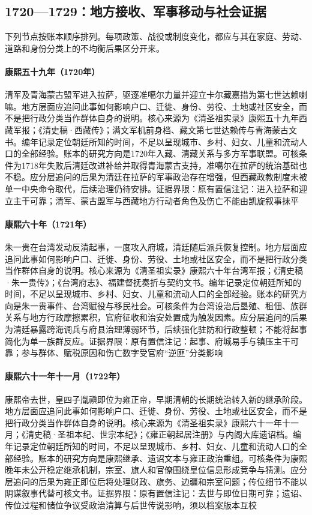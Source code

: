 \subsection{1720—1729：地方接收、军事移动与社会证据}
下列节点按账本顺序排列。每项政策、战役或制度变化，都应与其在家庭、劳动、道路和身份分类上的不均衡后果区分开来。
\hypertarget{social:EQ-1720-LHASA-RESTORATION}{}\paragraph{康熙五十九年（1720年）}清军及青海蒙古盟军进入拉萨，驱逐准噶尔力量并迎立卡尔藏嘉措为第七世达赖喇嘛。地方层面应追问此事如何影响户口、迁徙、身份、劳役、土地或社区安全，而不是把行政分类当作群体自身的说明。核心来源为《清圣祖实录》康熙五十九年西藏军报；《清史稿·西藏传》；满文军机前身档、藏文第七世达赖传与青海蒙古文书。编年记录定位朝廷所知的时间，不足以呈现城市、乡村、妇女、儿童和流动人口的全部经验。账本的研究方向是1720年入藏、清藏关系与多方军事联盟。可核条件为1718年失败后清廷改进补给并取得青海蒙古支持，准噶尔在拉萨的统治基础也不稳。应分层追问的后果为清廷在拉萨的军事政治存在增强，但西藏政教制度未被单一中央命令取代，后续治理仍待安排。证据界限：原有置信注记：进入拉萨和迎立主干可靠；清军、蒙古盟军与西藏地方行动者角色及伤亡不能由凯旋叙事抹平
\hypertarget{social:EQ-1721-ZHU-YIGUI}{}\paragraph{康熙六十年（1721年）}朱一贵在台湾发动反清起事，一度攻入府城，清廷随后派兵恢复控制。地方层面应追问此事如何影响户口、迁徙、身份、劳役、土地或社区安全，而不是把行政分类当作群体自身的说明。核心来源为《清圣祖实录》康熙六十年台湾军报；《清史稿·朱一贵传》；《台湾府志》、福建督抚奏折与契约文书。编年记录定位朝廷所知的时间，不足以呈现城市、乡村、妇女、儿童和流动人口的全部经验。账本的研究方向是朱一贵事件、台湾赋役与移民社会。可核条件为台湾设治后垦殖、租佃、族群关系与地方行政摩擦累积，官府征收和治安处置成为触发因素。应分层追问的后果为清廷暴露跨海调兵与府县治理薄弱环节，后续强化驻防和行政整顿；不能将起事简化为单一族群反应。证据界限：原有置信注记：起事、府城易手与镇压主干可靠；参与群体、赋税原因和伤亡数字受官府“逆匪”分类影响
\hypertarget{social:EQ-1722-KANGXI-DEATH}{}\paragraph{康熙六十一年十一月（1722年）}康熙帝去世，皇四子胤禛即位为雍正帝，早期清朝的长期统治转入新的继承阶段。地方层面应追问此事如何影响户口、迁徙、身份、劳役、土地或社区安全，而不是把行政分类当作群体自身的说明。核心来源为《清圣祖实录》康熙六十一年十一月；《清史稿·圣祖本纪、世宗本纪》；《雍正朝起居注册》与内阁大库遗诏档。编年记录定位朝廷所知的时间，不足以呈现城市、乡村、妇女、儿童和流动人口的全部经验。账本的研究方向是康熙继承、遗诏文本与雍正政治重组。可核条件为康熙晚年未公开稳定继承机制，宗室、旗人和官僚围绕皇位信息形成竞争与猜测。应分层追问的后果为雍正即位后将处理财政、旗务、边疆和宗室问题；传位细节不能以阴谋叙事代替可核文书。证据界限：原有置信注记：去世与即位日期可靠；遗诏、传位过程和储位争议受政治清算与后世传说影响，须以档案版本互校
